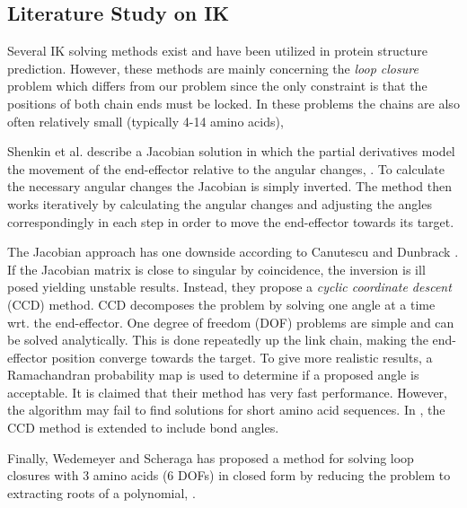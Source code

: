 

\subsection{Literature Study on IK}
Several IK solving methods exist and have been utilized in protein
structure prediction.  However, these methods are mainly concerning
the \emph{loop closure} problem \cite{coutsias2004kinematic} which
differs from our problem since the only constraint is that the
positions of both chain ends must be locked. In these problems the
chains are also often relatively small (typically 4-14 amino acids),

  
Shenkin et al. describe a Jacobian solution in which the partial derivatives model the movement of the end-effector relative to the angular changes, \cite{shenkin1987}.
To calculate the necessary angular changes the Jacobian is simply inverted.
The method then works iteratively by calculating the angular changes and adjusting the angles correspondingly in each step in order to move the end-effector towards its target.

The Jacobian approach has one downside according to Canutescu and Dunbrack
\cite{canutescu2003}.
If the Jacobian matrix is close to singular by coincidence, the inversion is ill posed yielding unstable results.
Instead, they propose a \emph{cyclic coordinate descent} (CCD) method.
CCD decomposes the problem by solving one angle at a time wrt. the end-effector.
One degree of freedom (DOF) problems are simple and can be solved analytically.
This is done repeatedly up the link chain, making the end-effector position converge towards the target.
To give more realistic results, a Ramachandran probability map is used to determine if a proposed angle is acceptable. 
It is claimed that their method has very fast performance. 
However, the algorithm may fail to find solutions for short amino acid sequences.
In \cite{boomsma2005full}, the CCD method is extended to include bond angles.

Finally, Wedemeyer and Scheraga has proposed a method for solving loop closures with 3 amino acids (6 DOFs) in closed form by reducing the problem to extracting roots of a polynomial, \cite{wedemeyer1999exact}.


